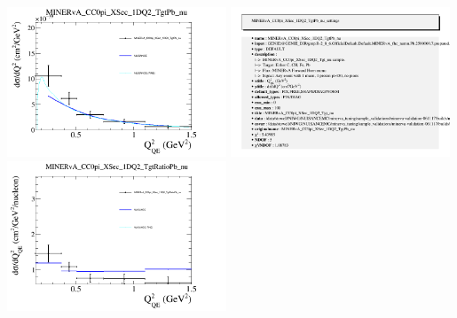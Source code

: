 \documentclass{article}
\begin{document}
\\\centering
\includegraphics[width=0.49\textwidth]{figures/nuisance_MINERvA_CC0pi_XSec_1DQ2_TgtPb_nu_comp.png}
\includegraphics[width=0.49\textwidth]{figures/nuisance_MINERvA_CC0pi_XSec_1DQ2_TgtPb_nu_info.png}
\centering
\includegraphics[width=0.49\textwidth]{figures/nuisance_MINERvA_CC0pi_XSec_1DQ2_TgtRatioPb_nu_comp.png}
\\
\end{document}
